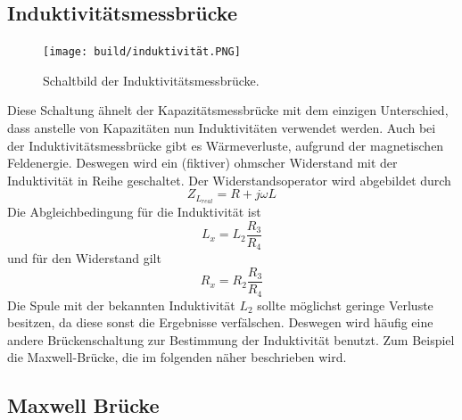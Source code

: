 \subsection{Induktivitätsmessbrücke}
\label{subsec:induktivität}

\begin{figure}[H]
    \centering
    \texttt{[image: build/induktivität.PNG]}
    \caption{Schaltbild der Induktivitätsmessbrücke.\cite[221]{V302}}
    \label{fig:induktivität}
\end{figure}
Diese Schaltung ähnelt der Kapazitätsmessbrücke mit dem einzigen Unterschied, dass anstelle von Kapazitäten nun Induktivitäten verwendet werden.
Auch bei der Induktivitätsmessbrücke gibt es Wärmeverluste, aufgrund der magnetischen Feldenergie.
Deswegen wird ein (fiktiver) ohmscher Widerstand mit der Induktivität in Reihe geschaltet.
Der Widerstandsoperator wird abgebildet durch
\begin{equation}
    Z_{L_{real}} = R + j\omega L
    \label{eqn:widerop_ind}
\end{equation}
Die Abgleichbedingung für die Induktivität ist
\begin{equation}
    L_x = L_2 \frac{R_3}{R_4}
    \label{eqn:induktivität_ind}
\end{equation}
und für den Widerstand gilt
\begin{equation}
    R_x = R_2 \frac{R_3}{R_4}
    \label{eqn:widerstand_ind}
\end{equation}
Die Spule mit der bekannten Induktivität $L_2$ sollte möglichst geringe Verluste besitzen, da diese sonst die Ergebnisse verfälschen. 
Deswegen wird häufig eine andere Brückenschaltung zur Bestimmung der Induktivität benutzt.
Zum Beispiel die Maxwell-Brücke, die im folgenden näher beschrieben wird.

\subsection{Maxwell Brücke}
\label{subsec:maxwell}

